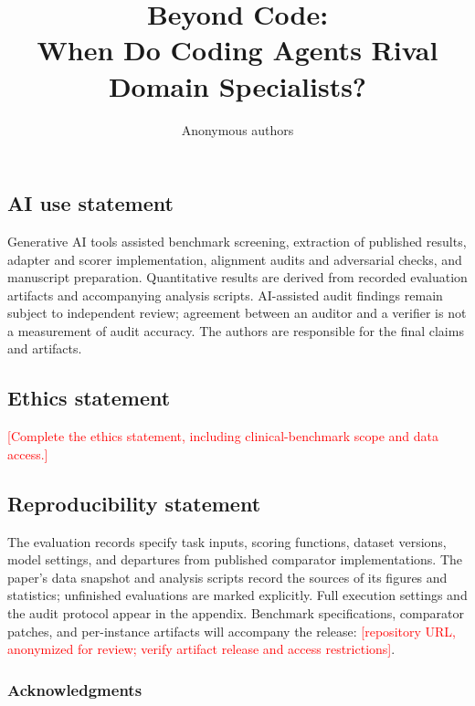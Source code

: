 \documentclass{article} %
\title{Beyond Code:\\ When Do Coding Agents Rival Domain Specialists?}
\author{Anonymous authors}
\newcommand{\todo}[1]{\textcolor{red}{[#1]}}
\begin{document}
\maketitle
\ificlrfinal
\fi

\begin{abstract}

\end{abstract}









\subsection*{AI use statement}
Generative AI tools assisted benchmark screening, extraction of published results, adapter and
scorer implementation, alignment audits and adversarial checks, and manuscript preparation.
Quantitative results are derived from recorded evaluation artifacts and accompanying analysis
scripts. AI-assisted audit findings remain subject to independent review; agreement between an
auditor and a verifier is not a measurement of audit accuracy. The authors are responsible for
the final claims and artifacts.

\subsection*{Ethics statement}
\todo{Complete the ethics statement, including clinical-benchmark scope and data access.}

\subsection*{Reproducibility statement}
The evaluation records specify task inputs, scoring functions, dataset versions, model settings,
and departures from published comparator implementations. The paper's data snapshot and analysis
scripts record the sources of its figures and statistics; unfinished evaluations are marked
explicitly. Full execution settings and the audit protocol appear in the appendix. Benchmark
specifications, comparator patches, and per-instance artifacts will accompany the release:
\todo{repository URL, anonymized for review; verify artifact release and access restrictions}.

\subsubsection*{Acknowledgments}




\appendix



\end{document}
